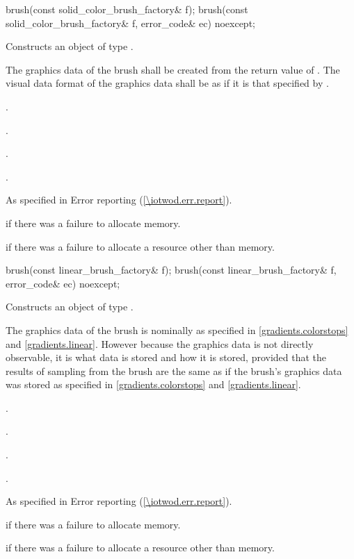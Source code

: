 \begin{itemdecl}
brush(const solid_color_brush_factory& f);
brush(const solid_color_brush_factory& f, error_code& ec) noexcept;
\end{itemdecl}
\begin{itemdescr}
\pnum
\effects
Constructs an object of type .

\pnum
The graphics data of the brush shall be created from the return value of . The visual data format of the graphics data shall be as if it is that specified by .

\pnum
\postconditions
{}.

.

.

.

\pnum
\throws
As specified in Error reporting (\ref{\iotwod.err.report}).

\pnum
\errors
{} if there was a failure to allocate memory.

 if there was a failure to allocate a resource other than memory.
\end{itemdescr}

\begin{itemdecl}
brush(const linear_brush_factory& f);
brush(const linear_brush_factory& f, error_code& ec) noexcept;
\end{itemdecl}
\begin{itemdescr}
\pnum
\effects
Constructs an object of type .

\pnum
The graphics data of the brush is nominally as specified in \ref{gradients.colorstops} and \ref{gradients.linear}. However because the graphics data is not directly observable, it is \unspecnorm what data is stored and how it is stored, provided that the results of sampling from the brush are the same as if the brush's graphics data was stored as specified in \ref{gradients.colorstops} and \ref{gradients.linear}.

\pnum
\postconditions
{}.

.

.

.

\pnum
\throws
As specified in Error reporting (\ref{\iotwod.err.report}).

\pnum
\errors
{} if there was a failure to allocate memory.

 if there was a failure to allocate a resource other than memory.
\end{itemdescr}


